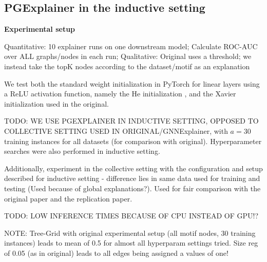 \subsection{PGExplainer in the inductive setting}

\textbf{Experimental setup}

Quantitative: 10 explainer runs on one downstream model; Calculate ROC-AUC over ALL graphs/nodes in each run;
Qualitative: Original uses a threshold; we instead take the topK nodes according to the dataset/motif as an explanation

We test both the standard weight initialization in PyTorch for linear layers using a ReLU activation function, namely the He initialization \cite{he2015delving}, and the Xavier initialization used in the original.


TODO: WE USE PGEXPLAINER IN INDUCTIVE SETTING, OPPOSED TO COLLECTIVE SETTING USED IN ORIGINAL/GNNExplainer, with $a=30$ training instances for all datasets (for comparison with original). Hyperparameter searches were also performed in inductive setting.

Additionally, experiment in the collective setting with the configuration and setup described for inductive setting - difference lies in same data used for training and testing (Used because of global explanations?). Used for fair comparison with the original paper and the replication paper.


TODO: LOW INFERENCE TIMES BECAUSE OF CPU INSTEAD OF GPU!?


NOTE: Tree-Grid with original experimental setup (all motif nodes, 30 training instances) leads to mean of 0.5 for almost all hyperparam settings tried. Size reg of 0.05 (as in original) leads to all edges being assigned a values of one!


